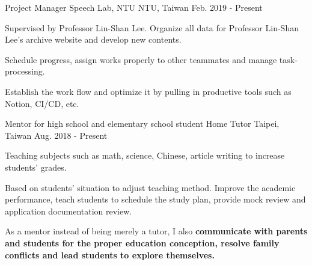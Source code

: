 

\begin{cventries}

  \cventry
    {Project Manager} %
    {Speech Lab, NTU} %
    {NTU, Taiwan} %
    {Feb. 2019 - Present} %
    {
      \begin{cvitems} %
        \item {Supervised by Professor Lin-Shan Lee. Organize all data for Professor Lin-Shan Lee's archive website and develop new contents.}
        \item {Schedule progress, assign works properly to other teammates and manage task-processing.}
        \item {Establish the work flow and optimize it by pulling in productive tools such as Notion, CI/CD, etc.}
      \end{cvitems}
    }

  \cventry
    {Mentor for high school and elementary school student} %
    {Home Tutor} %
    {Taipei, Taiwan} %
    {Aug. 2018 - Present} %
    {
      \begin{cvitems} %
        \item {Teaching subjects such as math, science, Chinese, article writing to increase students' grades.}
        \item {Based on students' situation to adjust teaching method. Improve the academic performance, teach students to schedule the study plan,
              provide mock review and application documentation review.}
        \item {As a mentor instead of being merely a tutor, I also
            \textbf{communicate with parents and students for the proper education conception, 
        resolve family conflicts and lead students to explore themselves.}}
      \end{cvitems}
    }

 

\end{cventries}
